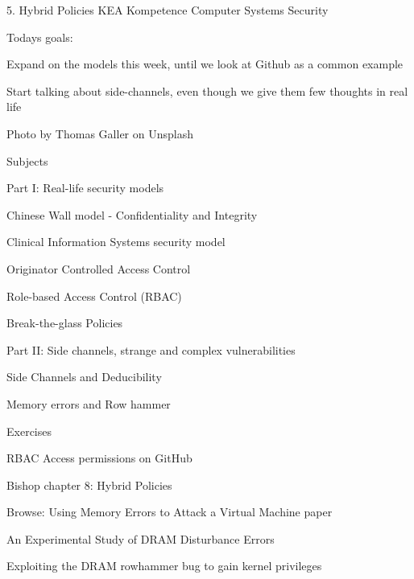 \documentclass[Screen16to9,17pt]{foils}
\begin{document}
\mytitlepage
{5. Hybrid Policies}
{KEA Kompetence Computer Systems Security \the\year}



Todays goals:
\begin{list2}
\item Expand on the models this week, until we look at Github as a common example
\item Start talking about side-channels, even though we give them few thoughts in real life
\end{list2}

{\small Photo by Thomas Galler on Unsplash}



\begin{list1}
\item Subjects
\item Part I: Real-life security models
\begin{list2}
\item Chinese Wall model - Confidentiality and Integrity
\item Clinical Information Systems security model
\item Originator Controlled Access Control
\item Role-based Access Control (RBAC)
\item Break-the-glass Policies
\end{list2}
\item Part II: Side channels, strange and complex vulnerabilities
\begin{list2}
\item Side Channels and Deducibility
\item Memory errors and Row hammer
\end{list2}
\item Exercises
\begin{list2}
\item RBAC Access permissions on GitHub
\end{list2}
\end{list1}




\begin{list1}
\item Bishop chapter 8: Hybrid Policies
\item Browse: Using Memory Errors to Attack a Virtual Machine paper
\item An Experimental Study of DRAM Disturbance Errors
\item Exploiting the DRAM rowhammer bug to gain kernel privileges
\item {}
\end{list1}
\end{document}
